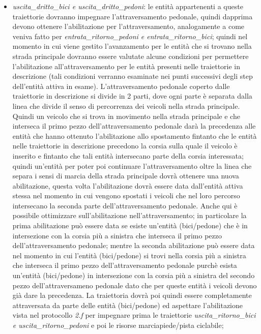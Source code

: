 \begin{enumerate}
\begin{enumerate}
\begin{itemize}
\item \textit{usci\-ta\_drit\-to\_bi\-ci e usci\-ta\_drit\-to\_pe\-do\-ni}: le entità appartenenti a queste traiettorie dovranno impegnare l'attraversamento pedonale, quindi dapprima devono ottenere l'abilitazione per l'attraversamento, analogamente a come veniva fatto per \textit{en\-tra\-ta\_ri\-tor\-no\_pe\-do\-ni e en\-tra\-ta\_ri\-tor\-no\_bi\-ci}; quindi nel momento in cui viene gestito l'avanzamento per le entità che si trovano nella strada principale dovranno essere valutate alcune condizioni per permettere l'abilitazione all'attraversamento per le entità presenti nelle traiettorie in descrizione (tali condizioni verranno esaminate nei punti successivi degli step dell'entità attiva in esame). L'attraversamento pedonale coperto dalle traiettorie in descrizione si divide in 2 parti, dove ogni parte è separata dalla linea che divide il senso di percorrenza dei veicoli nella strada principale. Quindi un veicolo che si trova in movimento nella strada principale e che interseca il primo pezzo dell'attraversamento pedonale darà la precedenza alle entità che hanno ottenuto l'abilitazione allo spostamento fintanto che le entità nelle traiettorie in descrizione precedono la corsia sulla quale il veicolo è inserito e fintanto che tali entità intersecano parte della corsia interessata; quindi un'entità per poter poi continuare l'attraversamento oltre la linea che separa i sensi di marcia della strada principale dovrà ottenere una nuova abilitazione, questa volta l'abilitazione dovrà essere data dall'entità attiva stessa nel momento in cui vengono spostati i veicoli che nel loro percorso intersecano la seconda parte dell'attraversamento pedonale. Anche qui è possibile ottimizzare sull'abilitazione nell'attraversamento; in particolare la prima abilitazione può essere data se esiste un'entità (bici/pedone) che è in intersezione con la corsia più a sinistra che interseca il primo pezzo dell'attraversamento pedonale; mentre la seconda abilitazione può essere data nel momento in cui l'entità (bici/pedone) si trovi nella corsia più a sinistra che interseca il primo pezzo dell'attraversamento pedonale purchè esista un'entità (bici/pedone) in intersezione con la corsia più a sinistra del secondo pezzo dell'attraversameno pedonale dato che per queste entità i veicoli devono già dare la precedenza. La traiettoria dovrà poi quindi essere completamente attraversata da parte delle entità (bici/pedone) ed aspettare l'abilitazione vista nel protocollo \textit{2.f} per impegnare prima le traiettorie \textit{usci\-ta\_ri\-tor\-no\_bi\-ci e usci\-ta\_ri\-tor\-no\_pe\-do\-ni} e poi le risorse marciapiede/pista ciclabile;

\end{itemize}
\end{enumerate}
\end{enumerate}

